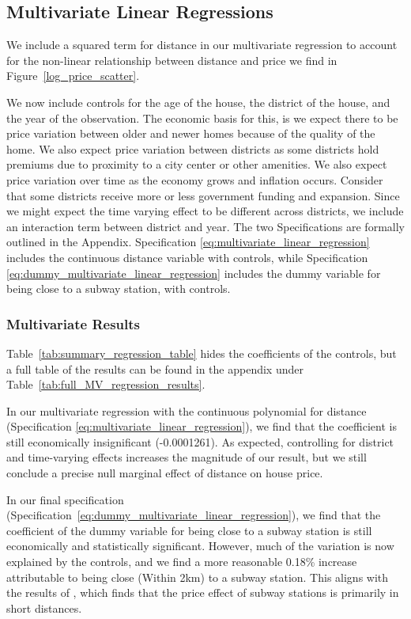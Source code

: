 \subsection{Multivariate Linear Regressions}
We include a squared term for distance in our multivariate regression to account for the non-linear relationship between distance and price we find in Figure~\ref{log_price_scatter}.

We now include controls for the age of the house, the district of the house, and the year of the observation. The economic basis for this, is we expect there to be 
price variation between older and newer homes because of the quality of the home. We also expect price variation between districts as some districts
hold premiums due to proximity to a city center or other amenities. We also expect price variation over time as the economy grows and inflation occurs.
Consider that some districts receive more or less government funding and expansion. Since we might expect the time varying effect to be different across districts, we include an interaction term between district and year.
The two Specifications are formally outlined in the Appendix. Specification \ref{eq:multivariate_linear_regression} includes the continuous distance variable with controls, while Specification \ref{eq:dummy_multivariate_linear_regression} 
includes the dummy variable for being close to a subway station, with controls.

\subsubsection{Multivariate Results}
Table~\ref{tab:summary_regression_table} hides the coefficients of the controls, but a full table of the results can be found in the appendix under Table~\ref{tab:full_MV_regression_results}.

In our multivariate regression with the continuous polynomial for distance (Specification \ref{eq:multivariate_linear_regression}), we find that the coefficient is still economically insignificant (-0.0001261). As expected, controlling for district and time-varying effects increases the magnitude of our result, 
but we still conclude a precise null marginal effect of distance on house price.

In our final specification (Specification~\ref{eq:dummy_multivariate_linear_regression}),
 we find that the coefficient of the dummy variable for being close to a subway station is still economically and statistically significant. 
 However, much of the variation is now explained by the controls, and we find a more reasonable 0.18\% increase attributable to being close (Within 2km) to a subway station.
 This aligns with the results of \citet{rietveld_2007}, which finds that the price effect of subway stations is primarily in short distances.


